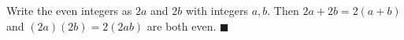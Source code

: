 Write the even integers as $2a$ and $2b$ with integers $a,b$. Then $2a+2b=2(a+b)$ and $(2a)(2b)=2(2ab)$ are both even. $\blacksquare$
